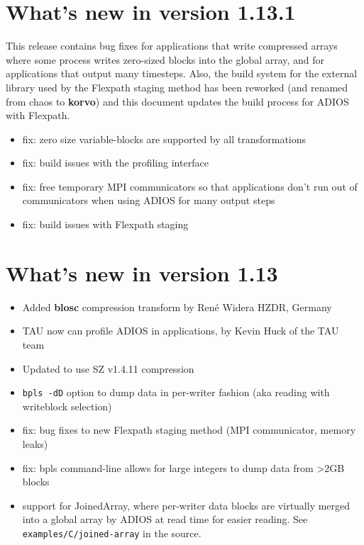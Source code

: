 %
%
\section {What's new in version 1.13.1}
This release contains bug fixes for applications that write compressed arrays where some process writes zero-sized blocks into the global array, and for applications that output many timesteps. Also, the build system for the external library used by the Flexpath staging method has been reworked (and renamed from chaos to {\bf korvo}) and this document updates the build process for ADIOS with Flexpath.

\begin{itemize}
\item fix: zero size variable-blocks are supported by all transformations
\item fix: build issues with the profiling interface
\item fix: free temporary MPI communicators so that applications don't run out of
	communicators when using ADIOS for many output steps
\item fix: build issues with Flexpath staging
	\end{itemize}


%
%
\section {What's new in version 1.13}

\begin{itemize}
\item Added {\bf blosc} compression transform by René Widera HZDR, Germany
\item TAU now can profile ADIOS in applications, by Kevin Huck of the TAU team
\item Updated to use SZ v1.4.11 compression
\item \verb+bpls -dD+ option to dump data in per-writer fashion (aka reading with writeblock selection)
\item fix: bug fixes to new Flexpath staging method (MPI communicator, memory leaks)
\item fix: bpls command-line allows for large integers to dump data from >2GB blocks
\item support for JoinedArray, where per-writer data blocks are virtually merged into
	a global array by ADIOS at read time for easier reading. See \verb+examples/C/joined-array+ in the source.
\end{itemize}

